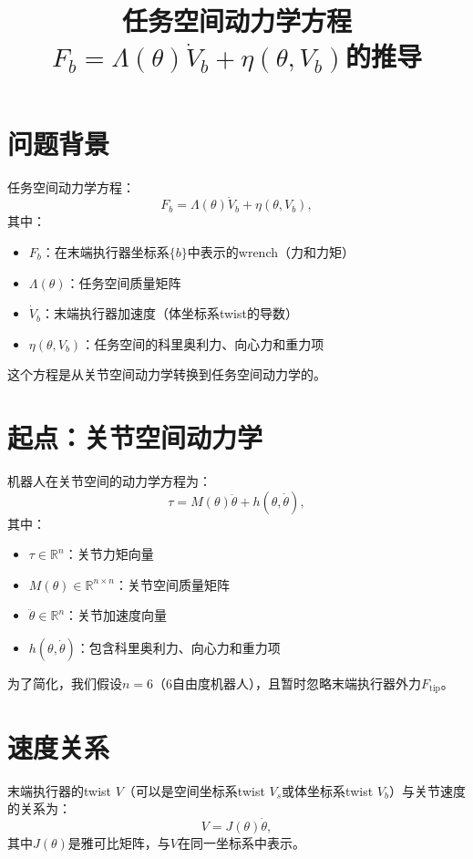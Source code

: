 \documentclass{article}
\title{任务空间动力学方程$F_b = \Lambda(\theta)\dot{V}_b + \eta(\theta, V_b)$的推导}
\author{}
\date{}
\begin{document}
\maketitle

\section{问题背景}

任务空间动力学方程：
\begin{equation}
F_b = \Lambda(\theta)\dot{V}_b + \eta(\theta, V_b),
\end{equation}
其中：
\begin{itemize}
\item $F_b$：在末端执行器坐标系$\{b\}$中表示的wrench（力和力矩）
\item $\Lambda(\theta)$：任务空间质量矩阵
\item $\dot{V}_b$：末端执行器加速度（体坐标系twist的导数）
\item $\eta(\theta, V_b)$：任务空间的科里奥利力、向心力和重力项
\end{itemize}

这个方程是从关节空间动力学转换到任务空间动力学的。

\section{起点：关节空间动力学}

机器人在关节空间的动力学方程为：
\begin{equation}
\tau = M(\theta)\ddot{\theta} + h(\theta, \dot{\theta}), \tag{8.82}
\end{equation}
其中：
\begin{itemize}
\item $\tau \in \mathbb{R}^n$：关节力矩向量
\item $M(\theta) \in \mathbb{R}^{n \times n}$：关节空间质量矩阵
\item $\ddot{\theta} \in \mathbb{R}^n$：关节加速度向量
\item $h(\theta, \dot{\theta})$：包含科里奥利力、向心力和重力项
\end{itemize}

为了简化，我们假设$n = 6$（6自由度机器人），且暂时忽略末端执行器外力$F_{\text{tip}}$。

\section{速度关系}

末端执行器的twist $V$（可以是空间坐标系twist $V_s$或体坐标系twist $V_b$）与关节速度的关系为：
\begin{equation}
V = J(\theta)\dot{\theta}, \tag{8.83}
\end{equation}
其中$J(\theta)$是雅可比矩阵，与$V$在同一坐标系中表示。
\end{document}
